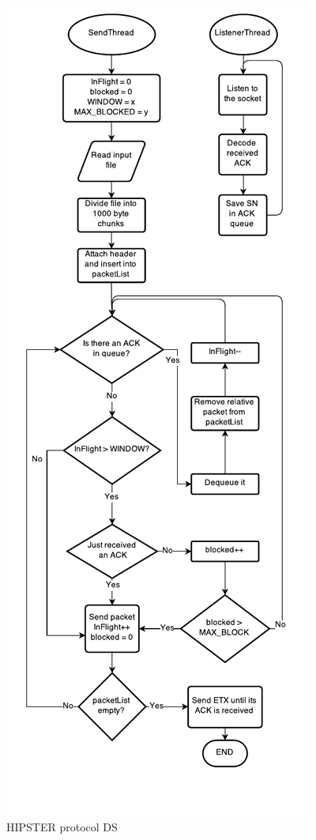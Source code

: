 \documentclass[10pt,twocolumn]{article}
\begin{document}
\begin{figure}[htp!]
	\centering
	\includegraphics[height=0.75\textheight]{Documentation/Sender.pdf}
	\caption{HIPSTER protocol DS}
	\label{fig:senderFlow}
\end{figure}
\end{document}

